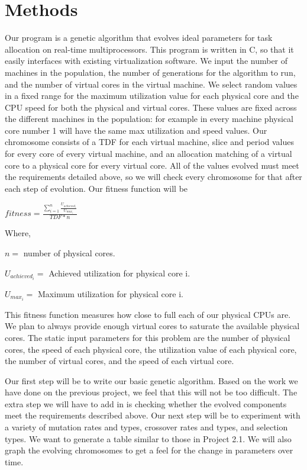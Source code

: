 \documentclass[11pt]{article}
\begin{document}
\section{Methods}

Our program is a genetic algorithm that evolves ideal parameters for task allocation on real-time multiprocessors. This program is written in C, so that it easily interfaces with existing virtualization software. We input the number of machines in the population, the number of generations for the algorithm to run, and the number of virtual cores in the virtual machine. We select random values in a fixed range for the maximum utilization value for each physical core and the CPU speed for both the physical and virtual cores. These values are fixed across the different machines in the population: for example in every machine physical core number 1 will have the same max utilization and speed values. Our chromosome consists of a TDF for each virtual machine, slice and period values for every core of every virtual machine, and an allocation matching of a virtual core to a physical core for every virtual core. All of the values evolved must meet the requirements detailed above, so we will check every chromosome for that after each step of evolution. Our fitness function will be 

\begin{center}

$fitness = \frac{\sum_{i=1}^{n} \frac{U_{achieved_i}}{U_{max_i}}}{TDF*n}$

\begin{flushleft}
Where,

$n =$ number of physical cores.

$U_{achieved_{i}} =$ Achieved utilization for physical core i.

$U_{max_{i}} =$ Maximum utilization for physical core i.
\end{flushleft}

\end{center}

This fitness function measures how close to full each of our physical CPUs are. We plan to always provide enough virtual cores to saturate the available physical cores. The static input parameters for this problem are the number of physical cores, the speed of each physical core, the utilization value of each physical core, the number of virtual cores, and the speed of each virtual core.

Our first step will be to write our basic genetic algorithm. Based on the work we have done on the previous project, we feel that this will not be too difficult. The extra step we will have to add in is checking whether the evolved components meet the requirements described above. Our next step will be to experiment with a variety of mutation rates and types, crossover rates and types, and selection types. We want to generate a table similar to those in Project 2.1. We will also graph the evolving chromosomes to get a feel for the change in parameters over time.
\end{document}
